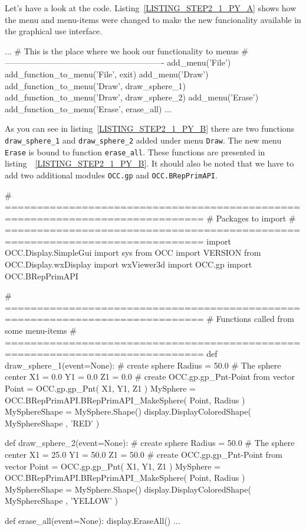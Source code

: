 Let's have a look at the code.
Listing~\ref{LISTING_STEP2_1_PY_A} shows how the menu and menu-items were changed to make the new funcionality available in the graphical use interface.
\begin{python}[moreemph={[4], 46, 48},caption={Step2\_1.py - Extending the menu},label=LISTING_STEP2_1_PY_A]
...
    # This is the place where we hook our functionality to menus
    # ----------------------------------------------------------
    add_menu('File')
    add_function_to_menu('File',  exit)
    add_menu('Draw')
    add_function_to_menu('Draw', draw_sphere_1)
    add_function_to_menu('Draw', draw_sphere_2)
    add_menu('Erase')
    add_function_to_menu('Erase', erase_all)
...    
\end{python}
As you can see in listing~\ref{LISTING_STEP2_1_PY_B} there are two functions {\tt draw\_sphere\_1} and {\tt draw\_sphere\_2} added under menu {\tt Draw}.
The new menu {\tt Erase} is bound to function {\tt erase\_all}.
These functions are presented in listing~~\ref{LISTING_STEP2_1_PY_B}.
It should also be noted that we have to add two additional modules {\tt OCC.gp} and {\tt OCC.BRepPrimAPI}.
%
\begin{python}[moreemph={[4], 46, 48},caption={Step2\_1.py - Extending the functionality},label=LISTING_STEP2_1_PY_B]
# =============================================================================
# Packages to import
# =============================================================================
import OCC.Display.SimpleGui 
import sys
from OCC import VERSION
from OCC.Display.wxDisplay import wxViewer3d
import OCC.gp 
import OCC.BRepPrimAPI 

# =============================================================================
# Functions called from some menu-items
# =============================================================================
def draw_sphere_1(event=None):
    # create sphere
    Radius = 50.0
    # The sphere center
    X1 = 0.0
    Y1 = 0.0
    Z1 = 0.0
    # create OCC.gp.gp_Pnt-Point from vector
    Point = OCC.gp.gp_Pnt( X1, Y1, Z1 )     
    MySphere = OCC.BRepPrimAPI.BRepPrimAPI_MakeSphere( Point, Radius )  
    MySphereShape = MySphere.Shape()
    display.DisplayColoredShape( MySphereShape , 'RED' ) 

def draw_sphere_2(event=None):
    # create sphere
    Radius = 50.0
    # The sphere center
    X1 = 25.0
    Y1 = 50.0
    Z1 = 50.0
    # create OCC.gp.gp_Pnt-Point from vector
    Point = OCC.gp.gp_Pnt( X1, Y1, Z1 )     
    MySphere = OCC.BRepPrimAPI.BRepPrimAPI_MakeSphere( Point, Radius )  
    MySphereShape = MySphere.Shape()
    display.DisplayColoredShape( MySphereShape , 'YELLOW' ) 

def erase_all(event=None):
    display.EraseAll()
...    
\end{python}
